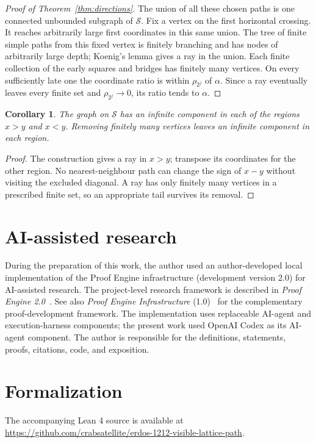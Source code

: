 \documentclass[11pt]{article}
\newtheorem{corollary}[theorem]{Corollary}
\theoremstyle{definition}
\theoremstyle{remark}
\newcommand{\cS}{\mathcal S}
\begin{document}
\begin{proof}[Proof of Theorem~\ref{thm:directions}]
The union of all these chosen paths is one connected unbounded subgraph
of $\cS$. Fix a vertex on the first horizontal crossing. It reaches
arbitrarily large first coordinates in this same union. The tree of finite
simple paths from this fixed vertex is finitely branching and has nodes
of arbitrarily large depth; Koenig's lemma gives a ray in the union.
Each finite collection of the early squares and bridges has finitely many
vertices. On every sufficiently late one the coordinate ratio is within
$\rho_{2^j}$ of $\alpha$. Since a ray eventually leaves every finite set
and $\rho_{2^j}\to0$, its ratio tends to $\alpha$.
\end{proof}

\begin{corollary}\label{cor:two-components}
The graph on $\cS$ has an infinite component in each of the regions $x>y$
and $x<y$. Removing finitely many vertices leaves an infinite component
in each region.
\end{corollary}
\begin{proof}
The construction gives a ray in $x>y$; transpose its coordinates for the
other region. No nearest-neighbour path can change the sign of $x-y$
without visiting the excluded diagonal. A ray has only finitely many
vertices in a prescribed finite set, so an appropriate tail survives its
removal.
\end{proof}

\section*{AI-assisted research}
During the preparation of this work, the author used an author-developed
local implementation of the Proof Engine infrastructure (development
version 2.0) for AI-assisted research. The project-level research framework is described
in \emph{Proof Engine 2.0}~\cite{LiProofEngineTwo2026}.
See also \emph{Proof Engine Infrastructure} (1.0)~\cite{LiProofEngine2026}
for the complementary proof-development framework.
The implementation uses replaceable AI-agent and execution-harness components;
the present work used OpenAI Codex as its AI-agent component. The author
is responsible for the definitions, statements, proofs, citations, code,
and exposition.

\section*{Formalization}
The accompanying Lean 4 source is available at\\
\url{https://github.com/crabsatellite/erdos-1212-visible-lattice-path}.
\end{document}
